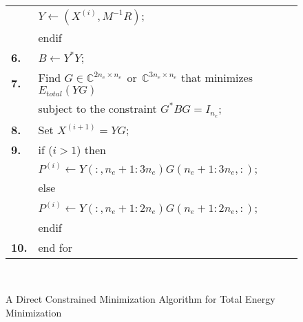 \documentclass[11pt]{book}
\newcommand{\exi} {X^{(i)}}
\begin{document}
\begin{figure}[h!]
\begin{center}
{{\begin{tabular}{p{0.3in}p{4.0in}}
                & \hspace*{0.6cm} $Y \leftarrow (\exi, M^{-1}R)$; \\
                & \hspace*{0.3cm} endif \\
{\bf \small 6.} & \hspace*{0.3cm} $B \leftarrow Y^{\ast} Y$; \\
{\bf \small 7.} & \hspace*{0.3cm} Find $G \in \mathbb{C}^{2n_e\times n_e} \ \
                  \mbox{or} \ \ \mathbb{C}^{3n_e\times n_e}$ that
                  minimizes $E_{total}(Y G)$ \\
                & \hspace*{0.3cm} subject to the constraint $G^{\ast} B G = I_{n_e}$;\\
{\bf \small 8.} & \hspace*{0.3cm} Set $X^{(i+1)} = Y G$; \\
{\bf \small 9.} & \hspace*{0.3cm} if ($i>1$) then \\
                & \hspace*{0.6cm} $P^{(i)} \leftarrow Y(:,n_e+1:3n_e)G(n_e+1:3n_e,:);$ \\
                & \hspace*{0.3cm} else \\
                & \hspace*{0.6cm} $P^{(i)} \leftarrow Y(:,n_e+1:2n_e)G(n_e+1:2n_e,:)$;\\
                & \hspace*{0.3cm} endif \\
{\bf \small 10.}& end for \\
\end{tabular} \\
}}
\end{center}
\caption{A Direct Constrained Minimization Algorithm for Total Energy Minimization}
\label{alg2}
\end{figure}
\end{document}
